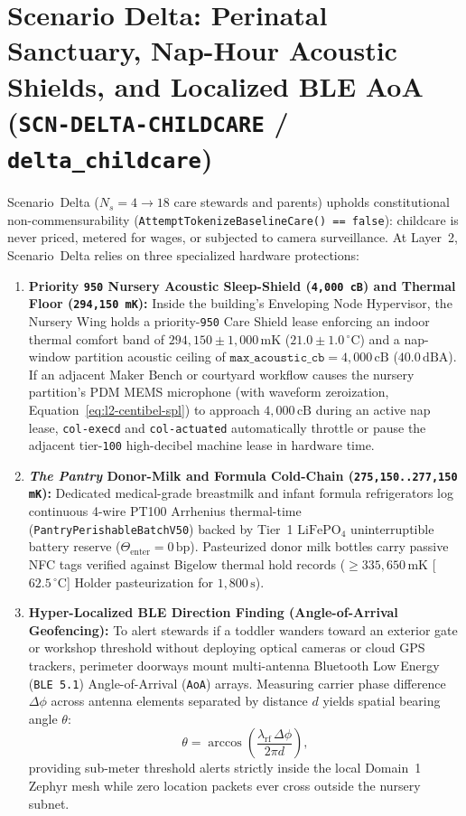 \section{Scenario Delta: Perinatal Sanctuary, Nap-Hour Acoustic Shields, and Localized BLE AoA (\texttt{SCN-DELTA-CHILDCARE} / \texttt{delta\_childcare})}
\label{sec:l2-wave-c-delta}

Scenario~Delta ($N_s = 4 \to 18$ care stewards and parents) upholds constitutional non-commensurability (\texttt{AttemptTokenizeBaselineCare() == false}): childcare is never priced, metered for wages, or subjected to camera surveillance. At Layer~2, Scenario~Delta relies on three specialized hardware protections:
\begin{enumerate}
    \item \textbf{Priority \texttt{950} Nursery Acoustic Sleep-Shield (\texttt{4,000 cB}) and Thermal Floor (\texttt{294,150 mK}):} Inside the building's Enveloping Node Hypervisor, the Nursery Wing holds a priority-\texttt{950} Care Shield lease enforcing an indoor thermal comfort band of $294{,}150 \pm 1{,}000\,\mathrm{mK}$ ($21.0 \pm 1.0\,^\circ\mathrm{C}$) and a nap-window partition acoustic ceiling of $\mathtt{max\_acoustic\_cb} = 4{,}000\,\mathrm{cB}$ ($40.0\,\mathrm{dBA}$). If an adjacent Maker Bench or courtyard workflow causes the nursery partition's PDM MEMS microphone (with waveform zeroization, Equation~\eqref{eq:l2-centibel-spl}) to approach $4{,}000\,\mathrm{cB}$ during an active nap lease, \texttt{col-execd} and \texttt{col-actuated} automatically throttle or pause the adjacent tier-\texttt{100} high-decibel machine lease in hardware time.
    \item \textbf{\textit{The Pantry} Donor-Milk and Formula Cold-Chain (\texttt{275,150..277,150 mK}):} Dedicated medical-grade breastmilk and infant formula refrigerators log continuous 4-wire PT100 Arrhenius thermal-time (\texttt{PantryPerishableBatchV50}) backed by Tier~1 $\mathrm{LiFePO_4}$ uninterruptible battery reserve ($\Theta_{\mathrm{enter}} = 0\,\mathrm{bp}$). Pasteurized donor milk bottles carry passive NFC tags verified against Bigelow thermal hold records ($\ge 335{,}650\,\mathrm{mK}$ [$62.5\,^\circ\mathrm{C}$] Holder pasteurization for $1{,}800\,\mathrm{s}$).
    \item \textbf{Hyper-Localized BLE Direction Finding (Angle-of-Arrival Geofencing):} To alert stewards if a toddler wanders toward an exterior gate or workshop threshold without deploying optical cameras or cloud GPS trackers, perimeter doorways mount multi-antenna Bluetooth Low Energy (\texttt{BLE~5.1}) Angle-of-Arrival (\texttt{AoA}) arrays. Measuring carrier phase difference $\Delta\phi$ across antenna elements separated by distance $d$ yields spatial bearing angle $\theta$:
    \begin{equation}
        \theta = \arccos\!\left(\frac{\lambda_{\mathrm{rf}}\, \Delta\phi}{2\pi d}\right),
        \label{eq:l2-ble-aoa}
    \end{equation}
    providing sub-meter threshold alerts strictly inside the local Domain~1 Zephyr mesh while zero location packets ever cross outside the nursery subnet.
\end{enumerate}


